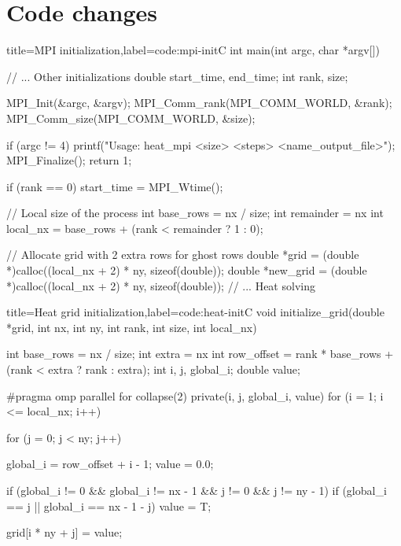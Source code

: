 \documentclass[../main.tex]{subfiles}
\begin{document}
\appendix

\section{Code changes}


\begin{code}{title=MPI initialization,label=code:mpi-init}{C}
    int main(int argc, char *argv[]) {
        // ... Other initializations
        double start_time, end_time;
        int rank, size;
        
        MPI_Init(&argc, &argv);
        MPI_Comm_rank(MPI_COMM_WORLD, &rank);
        MPI_Comm_size(MPI_COMM_WORLD, &size);
        
        if (argc != 4)
        {
            printf("Usage: heat_mpi <size> <steps> <name_output_file>\n");
            MPI_Finalize();
            return 1;
        }

        if (rank == 0) start_time = MPI_Wtime();

        // Local size of the process
        int base_rows = nx / size;
        int remainder = nx %
        int local_nx = base_rows + (rank < remainder ? 1 : 0);

        // Allocate grid with 2 extra rows for ghost rows
        double *grid = (double *)calloc((local_nx + 2) * ny, sizeof(double));
        double *new_grid = (double *)calloc((local_nx + 2) * ny, sizeof(double));
        // ... Heat solving
    }
\end{code}


\begin{code}{title=Heat grid initialization,label=code:heat-init}{C}
void initialize_grid(double *grid, int nx, int ny, int rank, int size, int local_nx)
{
    int base_rows = nx / size;
    int extra = nx %
    int row_offset = rank * base_rows + (rank < extra ? rank : extra);
    int i, j, global_i;
    double value;

#pragma omp parallel for collapse(2) private(i, j, global_i, value)
    for (i = 1; i <= local_nx; i++)
    {
        for (j = 0; j < ny; j++)
        {
            global_i = row_offset + i - 1;
            value = 0.0;

            if (global_i != 0 && global_i != nx - 1 && j != 0 && j != ny - 1)
            {
                if (global_i == j || global_i == nx - 1 - j)
                {
                    value = T;
                }
            }

            grid[i * ny + j] = value;
        }
    }
}
\end{code}
\end{document}
